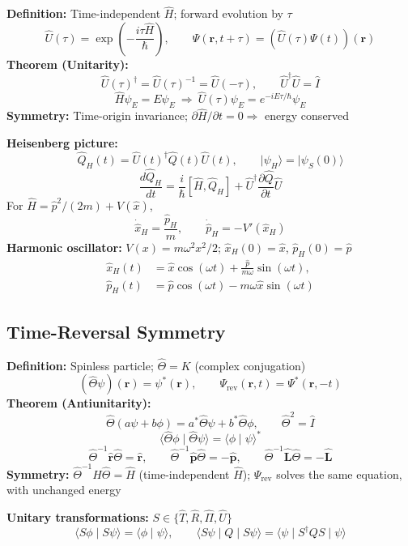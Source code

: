 \documentclass[12pt]{article}
\begin{document}
\textbf{Definition:} Time-independent $\hat H$; forward evolution by $\tau$
\[
  \hat U(\tau)=\exp\left(-\frac{i\tau\hat H}{\hbar}\right),\qquad
  \Psi(\boldsymbol r,t+\tau)=(\hat U(\tau)\Psi(t))(\boldsymbol r)
\]
\textbf{Theorem (Unitarity):}
\[
  \hat U(\tau)^\dagger=\hat U(\tau)^{-1}=\hat U(-\tau),\qquad
  \hat U^\dagger\hat U=\hat I
\]
\[
  \hat H\psi_E=E\psi_E
  \ \Longrightarrow\ \hat U(\tau)\psi_E=e^{-iE\tau/\hbar}\psi_E
\]
\textbf{Symmetry:} Time-origin invariance; $\partial\hat H/\partial t=0\Rightarrow$ energy conserved

\textbf{Heisenberg picture:}
\[
  \hat Q_H(t)=\hat U(t)^\dagger\hat Q(t)\hat U(t),\qquad
  \lvert\psi_H\rangle=\lvert\psi_S(0)\rangle
\]
\[
  \frac{d\hat Q_H}{dt}
  =\frac{i}{\hbar}[\hat H,\hat Q_H]
   +\hat U^\dagger\frac{\partial\hat Q}{\partial t}\hat U
\]
For $\hat H=\hat p^2/(2m)+V(\hat x)$,
\[
  \dot{\hat x}_H=\frac{\hat p_H}{m},\qquad
  \dot{\hat p}_H=-V'(\hat x_H)
\]
\textbf{Harmonic oscillator:} $V(x)=m\omega^2x^2/2$; $\hat x_H(0)=\hat x$, $\hat p_H(0)=\hat p$
\[
  \begin{aligned}
    \hat x_H(t)&=\hat x\cos(\omega t)+\frac{\hat p}{m\omega}\sin(\omega t),\\
    \hat p_H(t)&=\hat p\cos(\omega t)-m\omega\hat x\sin(\omega t)
  \end{aligned}
\]

\subsection{Time-Reversal Symmetry}

\textbf{Definition:} Spinless particle; $\hat\Theta=K$ (complex conjugation)
\[
  (\hat\Theta\psi)(\boldsymbol r)=\psi^*(\boldsymbol r),\qquad
  \Psi_{\mathrm{rev}}(\boldsymbol r,t)=\Psi^*(\boldsymbol r,-t)
\]
\textbf{Theorem (Antiunitarity):}
\[
  \hat\Theta(a\psi+b\phi)=a^*\hat\Theta\psi+b^*\hat\Theta\phi,
  \qquad \hat\Theta^2=\hat I
\]
\[
  \langle\hat\Theta\phi\mid\hat\Theta\psi\rangle=\langle\phi\mid\psi\rangle^*
\]
\[
  \hat\Theta^{-1}\hat{\boldsymbol r}\hat\Theta=\hat{\boldsymbol r},\qquad
  \hat\Theta^{-1}\hat{\boldsymbol p}\hat\Theta=-\hat{\boldsymbol p},\qquad
  \hat\Theta^{-1}\hat{\boldsymbol L}\hat\Theta=-\hat{\boldsymbol L}
\]
\textbf{Symmetry:} $\hat\Theta^{-1}\hat H\hat\Theta=\hat H$ (time-independent $\hat H$);
$\Psi_{\mathrm{rev}}$ solves the same equation, with unchanged energy

\textbf{Unitary transformations:} $S\in\{\hat T,\hat R,\hat\Pi,\hat U\}$
\[
  \langle S\phi\mid S\psi\rangle=\langle\phi\mid\psi\rangle,\qquad
  \langle S\psi\mid Q\mid S\psi\rangle
  =\langle\psi\mid S^\dagger Q S\mid\psi\rangle
\]
\end{document}
